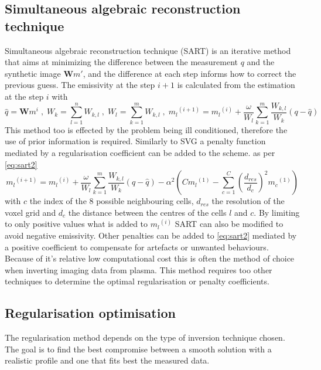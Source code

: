 \subsection{Simultaneous algebraic reconstruction technique}
Simultaneous algebraic reconstruction technique (SART) is an iterative method that aims at minimizing the difference between the measurement $q$ and the synthetic image $\bm{W}m'$, and the difference at each step informs how to correct the previous guess. The emissivity at the step $i+1$ is calculated from the estimation at the step $i$ with \cite{Carr2018,Andersen1984}
\begin{equation}
\hat{q} = \bm{W} m^i \; , \; W_{k} = {\sum_{l=1}^{n} W_{k,l}} \; , \; W_{l} = {\sum_{k=1}^{m} W_{k,l}}  \; , \; {m_{l}}^{(i+1)} = {m_{l}}^{(i)} + \frac{\omega}{W_{l}} {\sum_{k=1}^{m} \frac{W_{k,l}}{W_{k}}(q-\hat{q})}
\label{eq:sart1}
\end{equation}
This method too is effected by the problem being ill conditioned, therefore the use of prior information is required. Similarly to SVG a penalty function mediated by a regularisation coefficient can be added to the scheme.  as per \autoref{eq:sart2}
\begin{equation}
{m_{l}}^{(i+1)} = {m_{l}}^{(i)} + \frac{\omega}{W_{l}} {\sum_{k=1}^{m} \frac{W_{k,l}}{W_{k}}(q-\hat{q})} - \alpha^2(C {m_{l}}^{(1)} - {\sum_{c=1}^{C} \left(\frac{d_{res}}{d_c}\right)^2 {m_{c}}^{(1)}})
\label{eq:sart2}
\end{equation}
with $c$ the index of the 8 possible neighbouring cells, $d_{res}$ the resolution of the voxel grid and $d_c$  the distance between the centres of the cells $l$ and $c$.
By limiting to only positive values what is added to ${m_{l}}^{(i)}$ SART can also be modified to avoid negative emissivity. Other penalties can be added to \autoref{eq:sart2} mediated by a positive coefficient to compensate for artefacts or unwanted behaviours. \cite{Carr2018} Because of it's relative low computational cost this is often the method of choice when inverting imaging data from plasma. This method requires too other techniques to determine the optimal regularisation or penalty coefficients.

\subsection{Regularisation optimisation}\label{Regularisation_optimisation}
The regularisation method depends on the type of inversion technique chosen. The goal is to find the best compromise between a smooth solution with a realistic profile and one that fits best the measured data.
